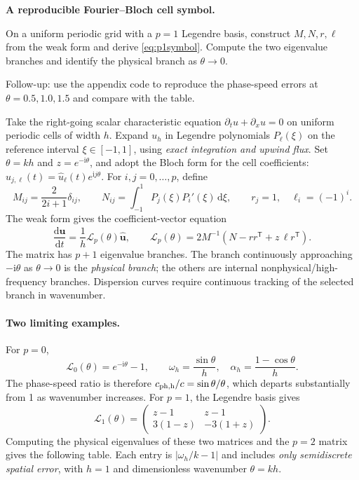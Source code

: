 \documentclass[11pt,openany]{book}
\numberwithin{equation}{chapter}
\theoremstyle{definition}
\theoremstyle{remark}
\newcommand{\dd}{\mathrm d}
\begin{document}
\noindent\textbf{A reproducible Fourier--Bloch cell symbol.}\par
\begin{askai}
On a uniform periodic grid with a $p=1$ Legendre basis, construct $M,N,r,\ell$ from the weak form and derive \eqref{eq:p1symbol}.
Compute the two eigenvalue branches and identify the physical branch as $\theta\to0$.

Follow-up: use the appendix code to reproduce the phase-speed errors at $\theta=0.5,1.0,1.5$ and compare with the table.
\end{askai}
Take the right-going scalar characteristic equation $\partial_tu+\partial_xu=0$
on uniform periodic cells of width $h$.
Expand $u_h$ in Legendre polynomials $P_\ell(\xi)$ on the reference interval $\xi\in[-1,1]$,
using \emph{exact integration and upwind flux}. Set
$\theta=kh$ and $z=e^{-\mathrm i\theta}$,
and adopt the Bloch form for the cell coefficients:
$u_{j,\ell}(t)=\widehat u_\ell(t)e^{\mathrm ij\theta}$.
For $i,j=0,\ldots,p$, define
\begin{equation}\label{eq:dgsymbol}
M_{ij}=\frac2{2i+1}\delta_{ij},\qquad
N_{ij}=\int_{-1}^1P_j(\xi)P_i'(\xi)\,\dd\xi,
\qquad
r_j=1,\quad\ell_i=(-1)^i.
\end{equation}
The weak form gives the coefficient-vector equation
\begin{equation}\label{eq:dgsymboleig}
\frac{\dd\widehat{\bm u}}{\dd t}
=\frac1h\mathcal L_p(\theta)\widehat{\bm u},\qquad
\boxed{\mathcal L_p(\theta)=2M^{-1}\left(N-r r^\mathsf T
+z\,\ell r^\mathsf T\right).}
\end{equation}
The matrix has $p+1$ eigenvalue branches.
The branch continuously approaching $-\mathrm i\theta$ as $\theta\to0$ is the \emph{physical branch};
the others are internal nonphysical/high-frequency branches.
Dispersion curves require continuous tracking of the selected branch in wavenumber.

\paragraph{Two limiting examples.}
For $p=0$,
\begin{equation}
\mathcal L_0(\theta)=e^{-\mathrm i\theta}-1,
\qquad
\omega_h=\frac{\sin\theta}{h},\quad
\alpha_h=\frac{1-\cos\theta}{h}.
\end{equation}
The phase-speed ratio is therefore $c_{\rm ph,h}/c=\sin\theta/\theta$, which departs substantially from 1 as wavenumber increases.
For $p=1$, the Legendre basis gives
\begin{equation}\label{eq:p1symbol}
\mathcal L_1(\theta)=
\begin{pmatrix}z-1&z-1\\3(1-z)&-3(1+z)\end{pmatrix}.
\end{equation}
Computing the physical eigenvalues of these two matrices and the $p=2$ matrix gives the following table.
Each entry is $|\omega_h/k-1|$ and includes \emph{only semidiscrete spatial error},
with $h=1$ and dimensionless wavenumber $\theta=kh$.
\end{document}
